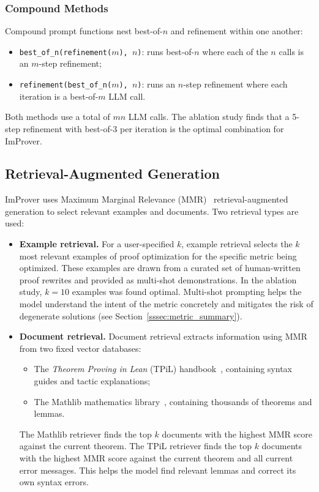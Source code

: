 \subsubsection{Compound Methods}

Compound prompt functions nest best-of-$n$ and refinement within one another:

\begin{itemize}
    \item \texttt{best\_of\_n(refinement($m$), $n$)}: runs best-of-$n$ where each of the $n$ calls is an $m$-step refinement;
    \item \texttt{refinement(best\_of\_n($m$), $n$)}: runs an $n$-step refinement where each iteration is a best-of-$m$ LLM call.
\end{itemize}
Both methods use a total of $mn$ LLM calls. The ablation study finds that a 5-step refinement with best-of-3 per iteration is the optimal combination for ImProver.

\subsection{Retrieval-Augmented Generation}
\label{ssec:rag}

ImProver uses Maximum Marginal Relevance (MMR)~\cite{10.1145/290941.291025} retrieval-augmented generation to select relevant examples and documents. Two retrieval types are used:
\begin{itemize}
    \item \textbf{Example retrieval.} For a user-specified $k$, example retrieval selects the $k$ most relevant examples of proof optimization for the specific metric being optimized. These examples are drawn from a curated set of human-written proof rewrites and provided as multi-shot demonstrations. In the ablation study, $k=10$ examples was found optimal. Multi-shot prompting helps the model understand the intent of the metric concretely and mitigates the risk of degenerate solutions (see Section~\ref{sssec:metric_summary}).

\item \textbf{Document retrieval.} Document retrieval extracts information using MMR from two fixed vector databases:
\begin{itemize}
    \item The \textit{Theorem Proving in Lean} (TPiL) handbook~\cite{avigad2024tpil}, containing syntax guides and tactic explanations;
    \item The Mathlib mathematics library~\cite{The_mathlib_Community_2020}, containing thousands of theorems and lemmas.
\end{itemize}
The Mathlib retriever finds the top $k$ documents with the highest MMR score against the current theorem. The TPiL retriever finds the top $k$ documents with the highest MMR score against the current theorem and all current error messages. This helps the model find relevant lemmas and correct its own syntax errors.

\end{itemize}
